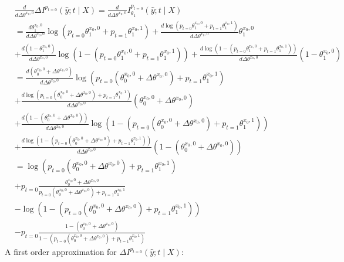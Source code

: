 \documentclass[oneside,12pt]{article}
\begin{document}
\begin{equation*}
    \begin{split}
        &\frac{d}{d\Delta\theta^{x_0,0}}\Delta I^{p_{t=0}}(\hat{y};t \mid X) = \frac{d}{d\Delta\theta^{x_0,0}} I^{p_{t=0}}_{\theta_1}(\hat{y};t \mid X)\\
        &= \frac{d\theta_1^{x_0,0}}{d\Delta\theta^{x_0,0}} \operatorname{log}(p_{t=0}\theta_1^{x_0,0}+p_{t=1}\theta_1^{x_0,1}) + \frac{d\operatorname{log}(p_{t=0}\theta_1^{x_0,0}+p_{t=1}\theta_1^{x_0,1})}{d\Delta\theta^{x_0,0}}\theta_1^{x_0,0}\\
        &+ \frac{d(1-\theta_1^{x_0,0})}{d\Delta\theta^{x_0,0}} \operatorname{log}(1-(p_{t=0}\theta_1^{x_0,0}+p_{t=1}\theta_1^{x_0,1})) + \frac{d\operatorname{log}(1-(p_{t=0}\theta_1^{x_0,0}+p_{t=1}\theta_1^{x_0,1}))}{d\Delta\theta^{x_0,0}}(1-\theta_1^{x_0,0})\\
        &= \frac{d(\theta_0^{x_0,0} + \Delta\theta^{x_0,0})}{d\Delta\theta^{x_0,0}} \operatorname{log}(p_{t=0}(\theta_0^{x_0,0} + \Delta\theta^{x_0,0})+p_{t=1}\theta_1^{x_0,1})\\ 
        &+ \frac{d\operatorname{log}(p_{t=0}(\theta_0^{x_0,0} + \Delta\theta^{x_0,0})+p_{t=1}\theta_1^{x_0,1})}{d\Delta\theta^{x_0,0}}(\theta_0^{x_0,0} + \Delta\theta^{x_0,0})\\
        &+ \frac{d(1-(\theta_0^{x_0,0} + \Delta\theta^{x_0,0}))}{d\Delta\theta^{x_0,0}} \operatorname{log}(1-(p_{t=0}(\theta_0^{x_0,0} + \Delta\theta^{x_0,0})+p_{t=1}\theta_1^{x_0,1}))\\ 
        &+ \frac{d\operatorname{log}(1-(p_{t=0}(\theta_0^{x_0,0} + \Delta\theta^{x_0,0})+p_{t=1}\theta_1^{x_0,1}))}{d\Delta\theta^{x_0,0}}(1-(\theta_0^{x_0,0} + \Delta\theta^{x_0,0}))\\
        &= \operatorname{log}(p_{t=0}(\theta_0^{x_0,0} + \Delta\theta^{x_0,0})+p_{t=1}\theta_1^{x_0,1})\\ 
        &+ p_{t=0}
        \frac{\theta_0^{x_0,0} + \Delta\theta^{x_0,0}}{p_{t=0}(\theta_0^{x_0,0} + \Delta\theta^{x_0,0})+p_{t=1}\theta_1^{x_0,1}}\\
        &- \operatorname{log}(1-(p_{t=0}(\theta_0^{x_0,0} + \Delta\theta^{x_0,0})+p_{t=1}\theta_1^{x_0,1}))\\ 
        &- p_{t=0}\frac{1-(\theta_0^{x_0,0} + \Delta\theta^{x_0,0})}{1-(p_{t=0}(\theta_0^{x_0,0} + \Delta\theta^{x_0,0})+p_{t=1}\theta_1^{x_0,1})}
    \end{split}
\end{equation*}
%
A first order approximation for $\Delta I^{p_{t=0}}(\hat{y};t \mid X)$:
\end{document}
